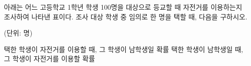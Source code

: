 아래는 어느 고등학교 1학년 학생 100명을 대상으로 등교할 때 자전거를 이용하는지 조사하여 나타낸 표이다. 조사 대상 학생 중 임의로 한 명을 택할 때, 다음을 구하시오.\par\noindent\hfill{\footnotesize (단위: 명)}\par\smallskip{}\par\smallskip\noindent
{} 택한 학생이 자전거를 이용할 때, 그 학생이 남학생일 확률
 택한 학생이 남학생일 때, 그 학생이 자전거를 이용할 확률
